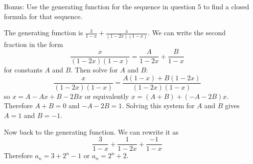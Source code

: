 \documentclass[11pt]{exam}
\def\d{\displaystyle}
\begin{document}
\begin{questions}
\bonusquestion[4] Bonus: Use the generating function for the sequence in question 5 to find a closed formula for that sequence.
\begin{solution}
  The generating function is $\d\frac{3}{1-x} + \frac{x}{(1-2x)(1-x)}$.  We can write the second fraction in the form 
  \[\frac{x}{(1-2x)(1-x)} = \frac{A}{1-2x} + \frac{B}{1-x}\]
  for constants $A$ and $B$.  Then solve for $A$ and $B$:
  \[\frac{x}{(1-2x)(1-x)} = \frac{A(1-x) + B(1-2x)}{(1-2x)(1-x)}\]
  so $x = A - Ax + B - 2Bx$ or equivalently $x = (A+B) +(-A -2B)x$.  Therefore $A + B = 0$ and $-A -2B = 1$.  Solving this system for $A$ and $B$ gives $A = 1$ and $B = -1$.  
  
  Now back to the generating function.  We can rewrite it as 
  \[\frac{3}{1-x} + \frac{1}{1-2x} + \frac{-1}{1-x}\]
  Therefore $a_n = 3 + 2^n - 1$ or $a_n = 2^n + 2$.
\end{solution}

\end{questions}
\end{document}
